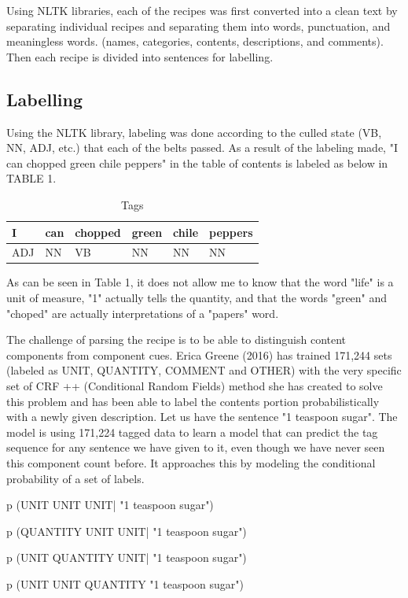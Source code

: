 Using NLTK libraries, each of the recipes was first converted into a clean text by separating individual recipes and separating them into words, punctuation, and meaningless words.  (names, categories, contents, descriptions, and comments). Then each recipe is divided into sentences for labelling.

\subsection{Labelling}
Using the NLTK library, labeling was done according to the culled state (VB, NN, ADJ, etc.) that each of the belts passed. As a result of the labeling made, "I can chopped green chile peppers" in the table of contents is labeled as below in TABLE 1.

\begin{table}[]
\centering
\caption{Tags}
\label{my-label}
\begin{tabular}{|l|l|l|l|l|l|}
\hline
I   & can & chopped & green & chile & peppers \\ \hline
ADJ & NN  & VB      & NN    & NN    & NN      \\ \hline
\end{tabular}
\end{table}

As can be seen in Table 1, it does not allow me to know that the word "life" is a unit of measure, "1" actually tells the quantity, and that the words "green" and "choped" are actually interpretations of a "papers" word.

The challenge of parsing the recipe is to be able to distinguish content components from component cues. Erica Greene (2016) has trained 171,244 sets (labeled as UNIT, QUANTITY, COMMENT and OTHER) with the very specific set of CRF ++ (Conditional Random Fields) method she has created to solve this problem and has been able to label the contents portion probabilistically with a newly given description. Let us have the sentence "1 teaspoon sugar". The model is using 171,224 tagged data to learn a model that can predict the tag sequence for any sentence we have given to it, even though we have never seen this component count before. It approaches this by modeling the conditional probability of a set of labels.

p (UNIT UNIT UNIT| "1 teaspoon sugar")

p (QUANTITY UNIT UNIT| "1 teaspoon sugar")

p (UNIT QUANTITY UNIT| "1 teaspoon sugar")

p (UNIT UNIT QUANTITY "1 teaspoon sugar")

